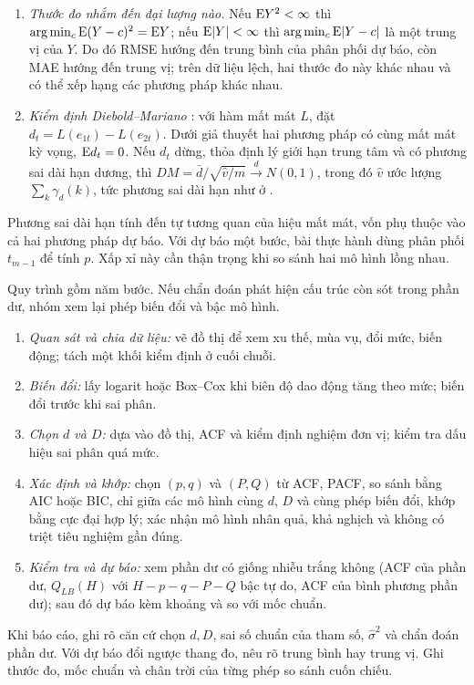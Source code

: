 \begin{kq}
\begin{enumerate}[label=(\roman*),leftmargin=*,itemsep=1pt]
\item \emph{Thước đo nhắm đến đại lượng nào.} Nếu $\mathrm{E} Y^2<\infty$ thì $\arg\min_c\mathrm{E}(Y-c)^2=\mathrm{E} Y$; nếu $\mathrm{E}|Y|<\infty$ thì $\arg\min_c\mathrm{E}|Y-c|$ là một trung vị của $Y$. Do đó RMSE hướng đến trung bình của phân phối dự báo, còn MAE hướng đến trung vị; trên dữ liệu lệch, hai thước đo này khác nhau và có thể xếp hạng các phương pháp khác nhau.
\item \emph{Kiểm định Diebold--Mariano} : với hàm mất mát $L$, đặt $d_t=L(e_{1t})-L(e_{2t})$. Dưới giả thuyết hai phương pháp có cùng mất mát kỳ vọng, $\mathrm{E} d_t=0$. Nếu $d_t$ dừng, thỏa định lý giới hạn trung tâm và có phương sai dài hạn dương, thì $DM=\bar d\big/\sqrt{\hat v/m}\xrightarrow{d}N(0,1)$, trong đó $\hat v$ ước lượng $\sum_k\gamma_d(k)$, tức phương sai dài hạn như ở .
\end{enumerate}
\end{kq}
Phương sai dài hạn tính đến tự tương quan của hiệu mất mát, vốn phụ thuộc vào cả hai phương pháp dự báo. Với dự báo một bước, bài thực hành dùng phân phối $t_{m-1}$ để tính $p$. Xấp xỉ này cần thận trọng khi so sánh hai mô hình lồng nhau.

Quy trình gồm năm bước. Nếu chẩn đoán phát hiện cấu trúc còn sót trong phần dư, nhóm xem lại phép biến đổi và bậc mô hình.
\begin{enumerate}[label=\textbf{Bước \arabic*.},leftmargin=2.2cm,itemsep=1pt]
\item \emph{Quan sát và chia dữ liệu:} vẽ đồ thị để xem xu thế, mùa vụ, đổi mức, biến động; tách một khối kiểm định ở cuối chuỗi.
\item \emph{Biến đổi:} lấy logarit hoặc Box--Cox khi biên độ dao động tăng theo mức; biến đổi trước khi sai phân.
\item \emph{Chọn $d$ và $D$:} dựa vào đồ thị, ACF và kiểm định nghiệm đơn vị; kiểm tra dấu hiệu sai phân quá mức.
\item \emph{Xác định và khớp:} chọn $(p,q)$ và $(P,Q)$ từ ACF, PACF, so sánh bằng AIC hoặc BIC, chỉ giữa các mô hình cùng $d$, $D$ và cùng phép biến đổi, khớp bằng cực đại hợp lý; xác nhận mô hình nhân quả, khả nghịch và không có triệt tiêu nghiệm gần đúng.
\item \emph{Kiểm tra và dự báo:} xem phần dư có giống nhiễu trắng không (ACF của phần dư, $Q_{LB}(H)$ với $H-p-q-P-Q$ bậc tự do, ACF của bình phương phần dư); sau đó dự báo kèm khoảng và so với mốc chuẩn.
\end{enumerate}
Khi báo cáo, ghi rõ căn cứ chọn $d,D$, sai số chuẩn của tham số, $\hat\sigma^2$ và chẩn đoán phần dư. Với dự báo đổi ngược thang đo, nêu rõ trung bình hay trung vị. Ghi thước đo, mốc chuẩn và chân trời của từng phép so sánh cuốn chiếu.
\clearpage
